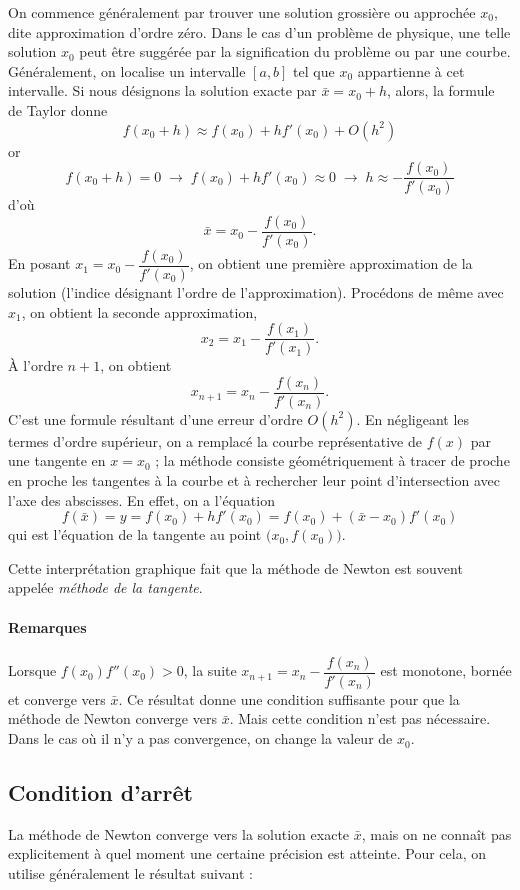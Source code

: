 On commence généralement par trouver une solution grossière ou approchée
$x_0$, dite approximation d'ordre zéro. Dans le cas d'un problème de physique,
une telle solution $x_0$ peut être suggérée par la signification du problème
ou par une courbe. Généralement, on localise un intervalle $[a,b]$ tel que
$x_0$ appartienne à cet intervalle. Si nous désignons la solution exacte par
$\bar{x} = x_0 + h$, alors, la formule de Taylor donne
\[
  f(x_0 + h) \approx f(x_0) + h f'(x_0) + O(h^2)
\]
or
\[
  f(x_0 + h) = 0 \;\longrightarrow\; f(x_0) + h f'(x_0) \approx 0
  \;\longrightarrow\; h \approx -\frac{f(x_0)}{f'(x_0)}
\]
d'où
\[
  \bar{x} = x_0 - \frac{f(x_0)}{f'(x_0)} .
\]
En posant $x_1 = x_0 - \dfrac{f(x_0)}{f'(x_0)}$, on obtient une première
approximation de la solution (l'indice désignant l'ordre de l'approximation).
Procédons de même avec $x_1$, on obtient la seconde approximation,
\[
  x_2 = x_1 - \frac{f(x_1)}{f'(x_1)} .
\]
À l'ordre $n+1$, on obtient
\[
  x_{n+1} = x_n - \frac{f(x_n)}{f'(x_n)} .
\]
C'est une formule résultant d'une erreur d'ordre $O(h^2)$. En négligeant les
termes d'ordre supérieur, on a remplacé la courbe représentative de $f(x)$ par
une tangente en $x = x_0$ ; la méthode consiste géométriquement à tracer de
proche en proche les tangentes à la courbe et à rechercher leur point
d'intersection avec l'axe des abscisses. En effet, on a l'équation
\[
  f(\bar{x}) = y = f(x_0) + h f'(x_0) = f(x_0) + (\bar{x} - x_0) f'(x_0)
\]
qui est l'équation de la tangente au point $\bigl(x_0, f(x_0)\bigr)$.

Cette interprétation graphique fait que la méthode de Newton est souvent
appelée \emph{méthode de la tangente}.

\paragraph{Remarques} Lorsque $f(x_0)f''(x_0) > 0$, la suite
$x_{n+1} = x_n - \dfrac{f(x_n)}{f'(x_n)}$ est monotone, bornée et converge vers
$\bar{x}$. Ce résultat donne une condition suffisante pour que la méthode de
Newton converge vers $\bar{x}$. Mais cette condition n'est pas nécessaire.
Dans le cas où il n'y a pas convergence, on change la valeur de $x_0$.

\subsection{Condition d'arrêt}

La méthode de Newton converge vers la solution exacte $\bar{x}$, mais on ne
connaît pas explicitement à quel moment une certaine précision est atteinte.
Pour cela, on utilise généralement le résultat suivant :

